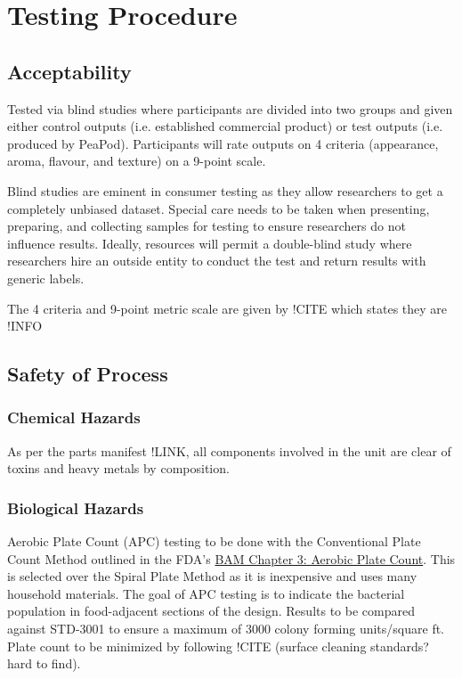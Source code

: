 \section{Testing Procedure}

\subsection{Acceptability}

Tested via blind studies where participants are divided into two groups and given either control outputs (i.e. established commercial product) or test outputs (i.e. produced by PeaPod). Participants will rate outputs on 4 criteria (appearance, aroma, flavour, and texture) on a 9-point scale.

Blind studies are eminent in consumer testing as they allow researchers to get a completely unbiased dataset. Special care needs to be taken when presenting, preparing, and collecting samples for testing to ensure researchers do not influence results. Ideally, resources will permit a double-blind study where researchers hire an outside entity to conduct the test and return results with generic labels.

The 4 criteria and 9-point metric scale are given by !CITE which states they are !INFO

\subsection{Safety of Process}
\subsubsection{Chemical Hazards}
As per the parts manifest !LINK, all components involved in the unit are clear of toxins and heavy metals by composition.

\subsubsection{Biological Hazards}
Aerobic Plate Count (APC) testing to be done with the Conventional Plate Count Method outlined in the FDA's \href{https://www.fda.gov/food/laboratory-methods-food/bam-chapter-3-aerobic-plate-count}{BAM Chapter 3: Aerobic Plate Count}. This is selected over the Spiral Plate Method as it is inexpensive and uses many household materials. The goal of APC testing is to indicate the bacterial population in food-adjacent sections of the design. Results to be compared against STD-3001 to ensure a maximum of 3000 colony forming units/square ft. Plate count to be minimized by following !CITE (surface cleaning standards? hard to find). 

